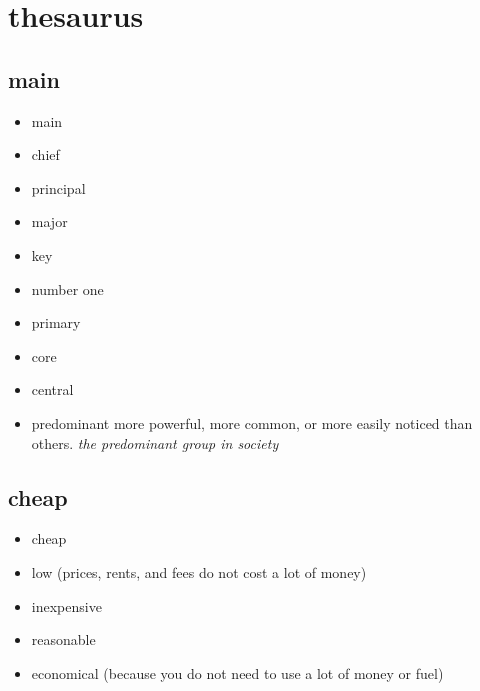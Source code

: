 \chapter{thesaurus}

\section{main}
\begin{itemize}
    \item main
    \item chief
    \item principal
    \item major
    \item key
    \item number one
    \item primary
    \item core
    \item central
    \item predominant more powerful, more common, or more easily noticed than others. \textit{the predominant group in society}
\end{itemize}

\section{cheap}
\begin{itemize}
    \item cheap
    \item low (prices, rents, and fees do not cost a lot of money)
    \item inexpensive
    \item reasonable
    \item economical (because you do not need to use a lot of money or fuel)
\end{itemize}

